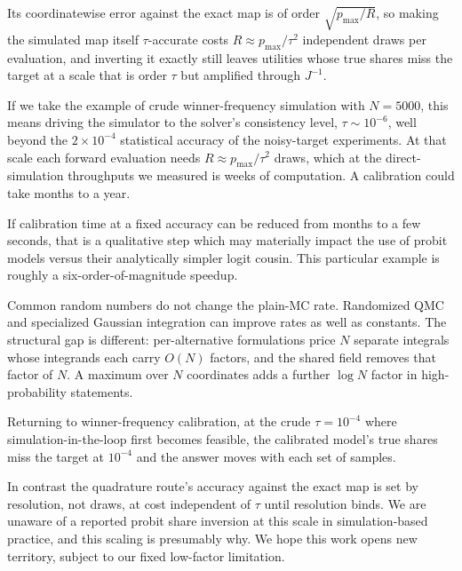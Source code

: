 \documentclass[12pt]{article}
\theoremstyle{remark}
\begin{document}
Its coordinatewise error against the exact map is of order
$\sqrt{p_{\max}/R}$, so making the simulated map itself $\tau$-accurate
costs $R \approx p_{\max}/\tau^2$ independent draws per evaluation, and
inverting it exactly still leaves utilities whose true shares miss the
target at a scale that is order $\tau$ but amplified through $J^{-1}$.

If we take the example of crude winner-frequency simulation with $N = 5000$, this
means driving the simulator to the solver's consistency level, $\tau
\sim 10^{-6}$, well beyond the $2\times10^{-4}$ statistical accuracy of the
noisy-target experiments. At that scale each forward evaluation needs
$R \approx p_{\max}/\tau^2$ draws, which at the direct-simulation
throughputs we measured is weeks of computation. A calibration could
take months to a year. 

If calibration time at a fixed accuracy can be reduced from months to
a few seconds, that is a qualitative step which may materially impact
the use of probit models versus their analytically simpler logit
cousin. This particular example is roughly a six-order-of-magnitude speedup. 

Common random numbers do not change the plain-MC rate. Randomized QMC and
specialized Gaussian integration can improve rates as well as
constants. The structural gap is different: per-alternative
formulations price $N$ separate integrals whose integrands each carry
$O(N)$ factors, and the shared field removes that factor of $N$. A
maximum over $N$ coordinates adds a further $\log N$ factor in
high-probability statements.

Returning to winner-frequency calibration, at the crude
$\tau = 10^{-4}$ where simulation-in-the-loop first becomes feasible, the calibrated model's true
shares miss the target at $10^{-4}$ and the answer moves with each set of samples. 

In contrast the quadrature route's accuracy against the exact map is set by
resolution, not draws, at cost independent of $\tau$ until resolution
binds. We are unaware of a reported
probit share inversion at this scale in simulation-based practice, and this
scaling is presumably why. We hope this work opens new territory,
subject to our fixed low-factor limitation. 
\end{document}
